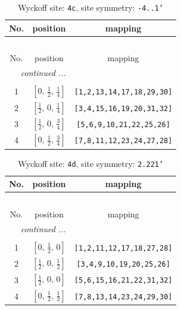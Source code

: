 \documentclass[fleqn,8pt]{jsarticle}
\begin{document}
\renewcommand{\arraystretch}{1.2}
\begin{longtable}{ccc}
\caption{Wyckoff site: {\tt 4c}, site symmetry: {\tt -4..1'}}
 \\
 \hline \hline
No. & position & mapping \\ \hline \endfirsthead

\multicolumn{2}{l}{\tablename\ \thetable{}} \\
 \hline \hline
No. & position & mapping \\ \hline \endhead

 \hline \hline
\multicolumn{2}{r}{\footnotesize\it continued ...} \\ \endfoot

 \hline \hline
\multicolumn{2}{r}{} \\ \endlastfoot

1 & $\left[ 0,\, \frac{1}{2},\, \frac{1}{4} \right]$ & {\tt [1,2,13,14,17,18,29,30]} \\ \hline
2 & $\left[ \frac{1}{2},\, 0,\, \frac{1}{4} \right]$ & {\tt [3,4,15,16,19,20,31,32]} \\ \hline
3 & $\left[ \frac{1}{2},\, 0,\, \frac{3}{4} \right]$ & {\tt [5,6,9,10,21,22,25,26]} \\ \hline
4 & $\left[ 0,\, \frac{1}{2},\, \frac{3}{4} \right]$ & {\tt [7,8,11,12,23,24,27,28]} \\
\end{longtable}
\renewcommand{\arraystretch}{1.2}
\begin{longtable}{ccc}
\caption{Wyckoff site: {\tt 4d}, site symmetry: {\tt 2.221'}}
 \\
 \hline \hline
No. & position & mapping \\ \hline \endfirsthead

\multicolumn{2}{l}{\tablename\ \thetable{}} \\
 \hline \hline
No. & position & mapping \\ \hline \endhead

 \hline \hline
\multicolumn{2}{r}{\footnotesize\it continued ...} \\ \endfoot

 \hline \hline
\multicolumn{2}{r}{} \\ \endlastfoot

1 & $\left[ 0,\, \frac{1}{2},\, 0 \right]$ & {\tt [1,2,11,12,17,18,27,28]} \\ \hline
2 & $\left[ \frac{1}{2},\, 0,\, \frac{1}{2} \right]$ & {\tt [3,4,9,10,19,20,25,26]} \\ \hline
3 & $\left[ \frac{1}{2},\, 0,\, 0 \right]$ & {\tt [5,6,15,16,21,22,31,32]} \\ \hline
4 & $\left[ 0,\, \frac{1}{2},\, \frac{1}{2} \right]$ & {\tt [7,8,13,14,23,24,29,30]} \\
\end{longtable}
\end{document}
